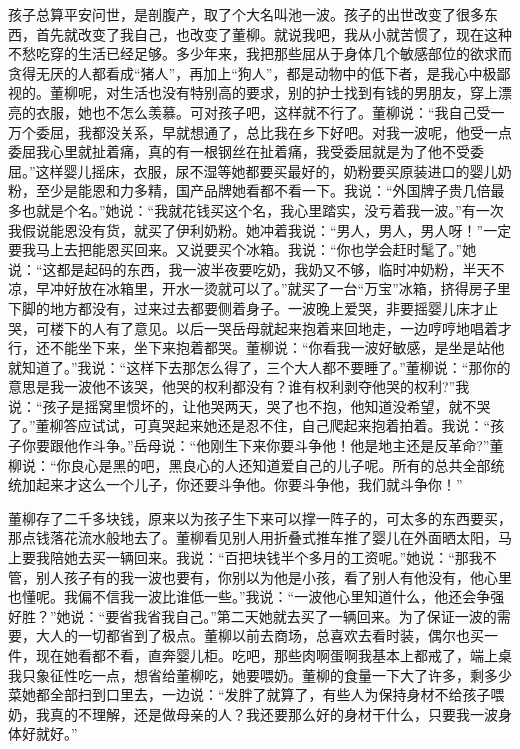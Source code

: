 \documentclass[12pt,oneside]{book}
\begin{document}
孩子总算平安问世，是剖腹产，取了个大名叫池一波。孩子的出世改变了很多东西，首先就改变了我自己，也改变了董柳。就说我吧，我从小就苦惯了，现在这种不愁吃穿的生活已经足够。多少年来，我把那些屈从于身体几个敏感部位的欲求而贪得无厌的人都看成``猪人''，再加上``狗人''，都是动物中的低下者，是我心中极鄙视的。董柳呢，对生活也没有特别高的要求，别的护士找到有钱的男朋友，穿上漂亮的衣服，她也不怎么羡慕。可对孩子吧，这样就不行了。董柳说：``我自己受一万个委屈，我都没关系，早就想通了，总比我在乡下好吧。对我一波呢，他受一点委屈我心里就扯着痛，真的有一根钢丝在扯着痛，我受委屈就是为了他不受委屈。''这样婴儿摇床，衣服，尿不湿等她都要买最好的，奶粉要买原装进口的婴儿奶粉，至少是能恩和力多精，国产品牌她看都不看一下。我说：``外国牌子贵几倍最多也就是个名。''她说：``我就花钱买这个名，我心里踏实，没亏着我一波。''有一次我假说能恩没有货，就买了伊利奶粉。她冲着我说：``男人，男人，男人呀！''一定要我马上去把能恩买回来。又说要买个冰箱。我说：``你也学会赶时髦了。''她说：``这都是起码的东西，我一波半夜要吃奶，我奶又不够，临时冲奶粉，半天不凉，早冲好放在冰箱里，开水一烫就可以了。''就买了一台``万宝''冰箱，挤得房子里下脚的地方都没有，过来过去都要侧着身子。一波晚上爱哭，非要摇婴儿床才止哭，可楼下的人有了意见。以后一哭岳母就起来抱着来回地走，一边哼哼地唱着才行，还不能坐下来，坐下来抱着都哭。董柳说：``你看我一波好敏感，是坐是站他就知道了。''我说：``这样下去那怎么得了，三个大人都不要睡了。''董柳说：``那你的意思是我一波他不该哭，他哭的权利都没有？谁有权利剥夺他哭的权利?''我说：``孩子是摇窝里惯坏的，让他哭两天，哭了也不抱，他知道没希望，就不哭了。''董柳答应试试，可真哭起来她还是忍不住，自己爬起来抱着拍着。我说：``孩子你要跟他作斗争。''岳母说：``他刚生下来你要斗争他！他是地主还是反革命?''董柳说：``你良心是黑的吧，黑良心的人还知道爱自己的儿子呢。所有的总共全部统统加起来才这么一个儿子，你还要斗争他。你要斗争他，我们就斗争你！''

董柳存了二千多块钱，原来以为孩子生下来可以撑一阵子的，可太多的东西要买，那点钱落花流水般地去了。董柳看见别人用折叠式推车推了婴儿在外面晒太阳，马上要我陪她去买一辆回来。我说：``百把块钱半个多月的工资呢。''她说：``那我不管，别人孩子有的我一波也要有，你别以为他是小孩，看了别人有他没有，他心里也懂呢。我偏不信我一波比谁低一些。''我说：``一波他心里知道什么，他还会争强好胜？''她说：``要省我省我自己。''第二天她就去买了一辆回来。为了保证一波的需要，大人的一切都省到了极点。董柳以前去商场，总喜欢去看时装，偶尔也买一件，现在她看都不看，直奔婴儿柜。吃吧，那些肉啊蛋啊我基本上都戒了，端上桌我只象征性吃一点，想省给董柳吃，她要喂奶。董柳的食量一下大了许多，剩多少菜她都全部扫到口里去，一边说：``发胖了就算了，有些人为保持身材不给孩子喂奶，我真的不理解，还是做母亲的人？我还要那么好的身材干什么，只要我一波身体好就好。''
\end{document}
